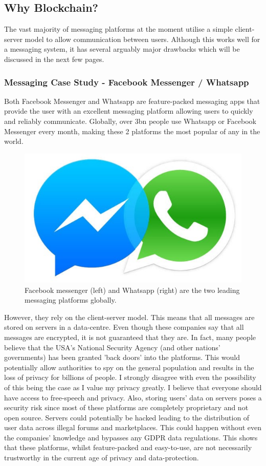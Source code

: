 \documentclass{article}
\begin{document}
\subsection{Why Blockchain?}
The vast majority of messaging platforms at the moment utilise a simple client-server model to allow communication between users. Although this works well for a messaging system, it has several arguably major drawbacks which will be discussed in the next few pages.

\subsubsection{Messaging Case Study - Facebook Messenger / Whatsapp}
Both Facebook Messenger and Whatsapp are feature-packed messaging apps that provide the user with an excellent messaging platform allowing users to quickly and reliably communicate. Globally, over 3bn people use Whatsapp or Facebook Messenger every month, making these 2 platforms the most popular of any in the world.
\begin{figure}[h]
    \centering
    \includegraphics[width=0.4\linewidth]{Images/fbmsgwhtspp.jpeg}
    \caption{Facebook messenger (left) and Whatsapp (right) are the two leading messaging platforms globally.}
    \label{fig:fbmsgwhtspp}
\end{figure}
However, they rely on the client-server model. This means that all messages are stored on servers in a data-centre. Even though these companies say that all messages are encrypted, it is not guaranteed that they are. In fact, many people believe that the USA's National Security Agency (and other nations' governments) has been granted 'back doors' into the platforms. This would potentially allow authorities to spy on the general population and results in the loss of privacy for billions of people. I strongly disagree with even the possibility of this being the case as I value my privacy greatly. I believe that everyone should have access to free-speech and privacy.
Also, storing users' data on servers poses a security risk since most of these platforms are completely proprietary and not open source. Servers could potentially be hacked leading to the distribution of user data across illegal forums and marketplaces. This could happen without even the companies' knowledge and bypasses any GDPR data regulations. This shows that these platforms, whilst feature-packed and easy-to-use, are not necessarily trustworthy in the current age of privacy and data-protection.
\end{document}
